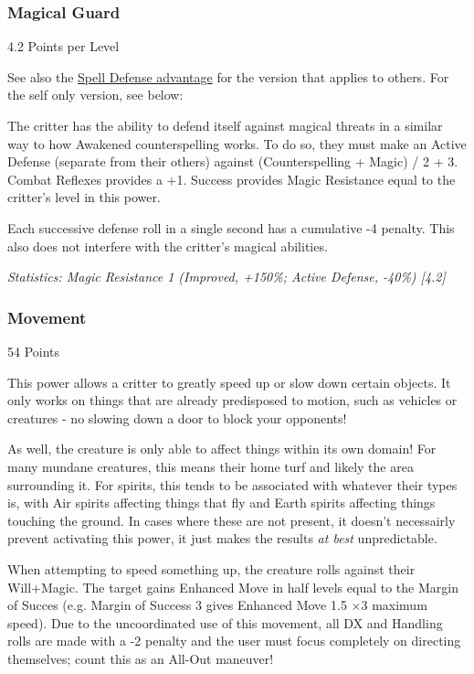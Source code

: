 \begin{multicols*}{3}
	\subsubsection{Magical Guard}\label{magical_guard}
	\begin{flushright}
		4.2 Points per Level
	\end{flushright}
	
	See also the \hyperref[spell_defense]{Spell Defense advantage} for  the version that applies to others. For the self only version, see below:
	
	The critter has the ability to defend itself against magical threats in a similar way to how Awakened counterspelling works.  To do so, they must make an Active Defense (separate from their others) against (Counterspelling + Magic) / 2 + 3. Combat Reflexes provides a +1. Success provides Magic Resistance equal to the critter's level in this power.
	
	Each successive defense roll in a single second has a cumulative -4 penalty. This also does not interfere with the critter's magical abilities.
	
	\textcolor{OliveGreen}{\textit{Statistics: Magic Resistance 1 (Improved, +150\%; Active Defense, -40\%) [4.2]}}
	
	\subsubsection{Movement}\label{movement}
	\begin{flushright}
		54 Points
	\end{flushright}
	
	This power allows a critter to greatly speed up or slow down certain objects. It only works on things that are already predisposed to motion, such as vehicles or creatures - no slowing down a door to block your opponents! 
	
	As well, the creature is only able to affect things within its own domain! For many mundane creatures, this means their home turf and likely the area surrounding it. For spirits, this tends to be associated with whatever their types is, with Air spirits affecting things that fly and Earth spirits affecting things touching the ground. In cases where these are not present, it doesn't necessairly prevent activating this power, it just makes the results \textit{at best} unpredictable.
	
	When attempting to speed something up, the creature rolls against their Will+Magic. The target gains Enhanced Move in half levels equal to the Margin of Succes (e.g. Margin of Success 3 gives Enhanced Move 1.5 \(\times\)3 maximum speed). Due to the uncoordinated use of this movement, all DX and Handling rolls are made with a -2 penalty and the user must focus completely on directing themselves; count this as an All-Out maneuver!
	

\end{multicols*}
